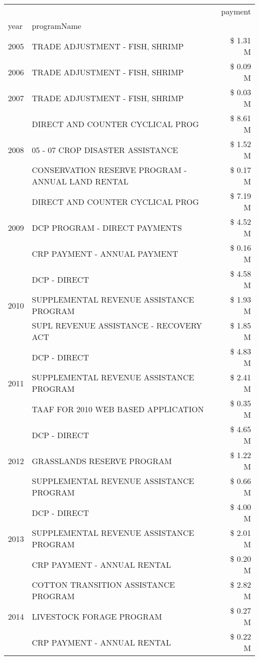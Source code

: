 \begin{tabular}{llr}
\toprule
 &  & payment \\
year & programName &  \\
\midrule
2005 & TRADE ADJUSTMENT - FISH, SHRIMP & \$ 1.31 M \\
\cline{1-3}
2006 & TRADE ADJUSTMENT - FISH, SHRIMP & \$ 0.09 M \\
\cline{1-3}
2007 & TRADE ADJUSTMENT - FISH, SHRIMP & \$ 0.03 M \\
\cline{1-3}
\multirow[t]{3}{*}{2008} & DIRECT AND COUNTER CYCLICAL PROG & \$ 8.61 M \\
 & 05 - 07 CROP DISASTER ASSISTANCE & \$ 1.52 M \\
 & CONSERVATION RESERVE PROGRAM - ANNUAL LAND RENTAL & \$ 0.17 M \\
\cline{1-3}
\multirow[t]{3}{*}{2009} & DIRECT AND COUNTER CYCLICAL PROG & \$ 7.19 M \\
 & DCP PROGRAM - DIRECT PAYMENTS & \$ 4.52 M \\
 & CRP PAYMENT - ANNUAL PAYMENT & \$ 0.16 M \\
\cline{1-3}
\multirow[t]{3}{*}{2010} & DCP - DIRECT & \$ 4.58 M \\
 & SUPPLEMENTAL REVENUE ASSISTANCE PROGRAM & \$ 1.93 M \\
 & SUPL REVENUE ASSISTANCE - RECOVERY ACT & \$ 1.85 M \\
\cline{1-3}
\multirow[t]{3}{*}{2011} & DCP - DIRECT & \$ 4.83 M \\
 & SUPPLEMENTAL REVENUE ASSISTANCE PROGRAM & \$ 2.41 M \\
 & TAAF FOR 2010 WEB BASED APPLICATION & \$ 0.35 M \\
\cline{1-3}
\multirow[t]{3}{*}{2012} & DCP - DIRECT & \$ 4.65 M \\
 & GRASSLANDS RESERVE PROGRAM & \$ 1.22 M \\
 & SUPPLEMENTAL REVENUE ASSISTANCE PROGRAM & \$ 0.66 M \\
\cline{1-3}
\multirow[t]{3}{*}{2013} & DCP - DIRECT & \$ 4.00 M \\
 & SUPPLEMENTAL REVENUE ASSISTANCE PROGRAM & \$ 2.01 M \\
 & CRP PAYMENT - ANNUAL RENTAL & \$ 0.20 M \\
\cline{1-3}
\multirow[t]{3}{*}{2014} & COTTON TRANSITION ASSISTANCE PROGRAM & \$ 2.82 M \\
 & LIVESTOCK FORAGE PROGRAM & \$ 0.27 M \\
 & CRP PAYMENT - ANNUAL RENTAL & \$ 0.22 M \\

\end{tabular}
